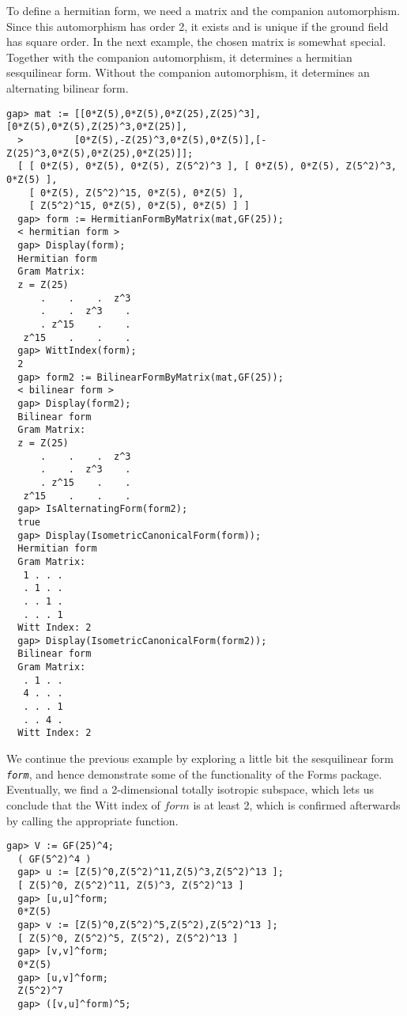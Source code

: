 \documentclass[a4paper,11pt]{report}
\begin{document}
{{{\begin{Verbatim}[fontsize=\small,frame=single,label=Example]
\end{Verbatim}
 To define a hermitian form, we need a matrix and the companion automorphism.
Since this automorphism has order 2, it exists and is unique if the ground
field has square order. In the next example, the chosen matrix is somewhat
special. Together with the companion automorphism, it determines a hermitian
sesquilinear form. Without the companion automorphism, it determines an
alternating bilinear form. 
\begin{Verbatim}[fontsize=\small,frame=single,label=Example]
  gap> mat := [[0*Z(5),0*Z(5),0*Z(25),Z(25)^3],[0*Z(5),0*Z(5),Z(25)^3,0*Z(25)],
  >         [0*Z(5),-Z(25)^3,0*Z(5),0*Z(5)],[-Z(25)^3,0*Z(5),0*Z(25),0*Z(25)]];
  [ [ 0*Z(5), 0*Z(5), 0*Z(5), Z(5^2)^3 ], [ 0*Z(5), 0*Z(5), Z(5^2)^3, 0*Z(5) ], 
    [ 0*Z(5), Z(5^2)^15, 0*Z(5), 0*Z(5) ], 
    [ Z(5^2)^15, 0*Z(5), 0*Z(5), 0*Z(5) ] ]
  gap> form := HermitianFormByMatrix(mat,GF(25));
  < hermitian form >
  gap> Display(form);
  Hermitian form
  Gram Matrix:
  z = Z(25)
      .    .    .  z^3
      .    .  z^3    .
      . z^15    .    .
   z^15    .    .    .
  gap> WittIndex(form);
  2
  gap> form2 := BilinearFormByMatrix(mat,GF(25));
  < bilinear form >
  gap> Display(form2);
  Bilinear form
  Gram Matrix:
  z = Z(25)
      .    .    .  z^3
      .    .  z^3    .
      . z^15    .    .
   z^15    .    .    .
  gap> IsAlternatingForm(form2);
  true
  gap> Display(IsometricCanonicalForm(form));
  Hermitian form
  Gram Matrix:
   1 . . .
   . 1 . .
   . . 1 .
   . . . 1
  Witt Index: 2
  gap> Display(IsometricCanonicalForm(form2));
  Bilinear form
  Gram Matrix:
   . 1 . .
   4 . . .
   . . . 1
   . . 4 .
  Witt Index: 2
\end{Verbatim}
 We continue the previous example by exploring a little bit the sesquilinear
form \mbox{\texttt{\slshape form}}, and hence demonstrate some of the functionality of the \textsf{Forms} package. Eventually, we find a 2-dimensional totally isotropic subspace, which
lets us conclude that the Witt index of $form$ is at least 2, which is confirmed afterwards by calling the appropriate
function. 
\begin{Verbatim}[fontsize=\small,frame=single,label=Example]
  gap> V := GF(25)^4;
  ( GF(5^2)^4 )
  gap> u := [Z(5)^0,Z(5^2)^11,Z(5)^3,Z(5^2)^13 ];
  [ Z(5)^0, Z(5^2)^11, Z(5)^3, Z(5^2)^13 ]
  gap> [u,u]^form;
  0*Z(5)
  gap> v := [Z(5)^0,Z(5^2)^5,Z(5^2),Z(5^2)^13 ];
  [ Z(5)^0, Z(5^2)^5, Z(5^2), Z(5^2)^13 ]
  gap> [v,v]^form;                                     
  0*Z(5)
  gap> [u,v]^form;
  Z(5^2)^7
  gap> ([v,u]^form)^5;

\end{Verbatim}}}}
\end{document}

